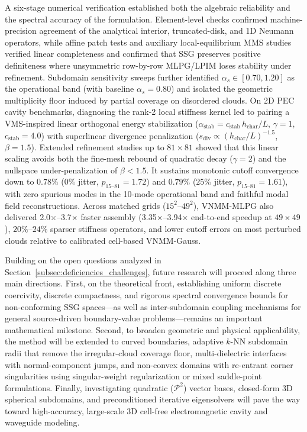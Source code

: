 \documentclass[VANCOUVER]{USG}
\begin{document}
A six-stage numerical verification established both the algebraic reliability and the spectral accuracy of the formulation. Element-level checks confirmed machine-precision agreement of the analytical interior, truncated-disk, and 1D Neumann operators, while affine patch tests and auxiliary local-equilibrium MMS studies verified linear completeness and confirmed that SSG preserves positive definiteness where unsymmetric row-by-row MLPG/LPIM loses stability under refinement. Subdomain sensitivity sweeps further identified $\alpha_s \in [0.70, 1.20]$ as the operational band (with baseline $\alpha_s = 0.80$) and isolated the geometric multiplicity floor induced by partial coverage on disordered clouds. On 2D PEC cavity benchmarks, diagnosing the rank-2 local stiffness kernel led to pairing a VMS-inspired linear orthogonal energy stabilization ($\alpha_{\mathrm{stab}} = c_{\mathrm{stab}}\,h_{\mathrm{char}}/L$, $\gamma = 1$, $c_{\mathrm{stab}} = 4.0$) with superlinear divergence penalization ($s_{\mathrm{div}} \propto (h_{\mathrm{char}}/L)^{-1.5}$, $\beta = 1.5$). Extended refinement studies up to $81\times 81$ showed that this linear scaling avoids both the fine-mesh rebound of quadratic decay ($\gamma = 2$) and the nullspace under-penalization of $\beta < 1.5$. It sustains monotonic cutoff convergence down to $0.78\%$ ($0\%$ jitter, $p_{15\text{--}81} = 1.72$) and $0.79\%$ ($25\%$ jitter, $p_{15\text{--}81} = 1.61$), with zero spurious modes in the 10-mode operational band and faithful modal field reconstructions. Across matched grids ($15^2\text{--}49^2$), VNMM-MLPG also delivered 2.0$\times$--3.7$\times$ faster assembly (3.35$\times$--3.94$\times$ end-to-end speedup at $49\times 49$), $20\%\text{--}24\%$ sparser stiffness operators, and lower cutoff errors on most perturbed clouds relative to calibrated cell-based VNMM-Gauss.

Building on the open questions analyzed in Section~\ref{subsec:deficiencies_challenges}, future research will proceed along three main directions. First, on the theoretical front, establishing uniform discrete coercivity, discrete compactness, and rigorous spectral convergence bounds for non-conforming SSG spaces---as well as inter-subdomain coupling mechanisms for general source-driven boundary-value problems---remains an important mathematical milestone. Second, to broaden geometric and physical applicability, the method will be extended to curved boundaries, adaptive $k$-NN subdomain radii that remove the irregular-cloud coverage floor, multi-dielectric interfaces with normal-component jumps, and non-convex domains with re-entrant corner singularities using singular-weight regularization or mixed saddle-point formulations. Finally, investigating quadratic ($\mathcal{P}^2$) vector bases, closed-form 3D spherical subdomains, and preconditioned iterative eigensolvers will pave the way toward high-accuracy, large-scale 3D cell-free electromagnetic cavity and waveguide modeling.
\end{document}
